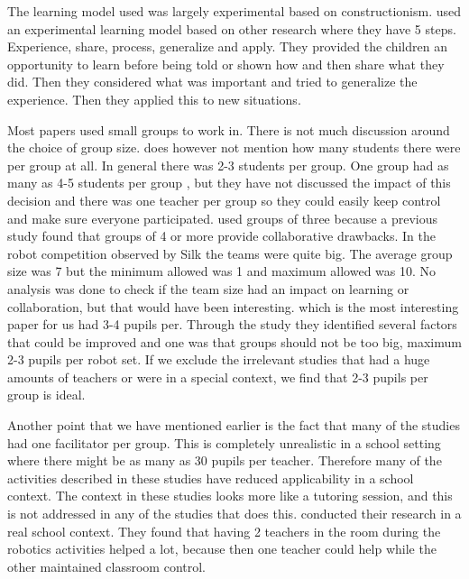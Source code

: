 \bigskip\noindent
The learning model used was largely experimental based on constructionism.  used an experimental learning model based on other research where they have 5 steps. Experience, share, process, generalize and apply. They provided the children an opportunity to learn before being told or shown how and then share what they did. Then they considered what was important and tried to generalize the experience. Then they applied this to new situations.

\bigskip\noindent
Most papers used small groups to work in. There is not much discussion around the choice of group size.  does however not mention how many students there were per group at all. In general there was 2-3 students per group\cite{mitnik2009collaborative, norton2004using, lindh2007does, silk2011resources, nugent2009use, williams2007acquisition}. One group had as many as 4-5 students per group \cite{barker2007robotics}, but they have not discussed the impact of this decision and there was one teacher per group so they could easily keep control and make sure everyone participated.  used groups of three because a previous study found that groups of 4 or more provide collaborative drawbacks. In the robot competition observed by Silk \cite{silk2011resources} the teams were quite big. The average group size was 7 but the minimum allowed was 1 and maximum allowed was 10. No analysis was done to check if the team size had an impact on learning or collaboration, but that would have been interesting.  which is the most interesting paper for us had 3-4 pupils per. Through the study they identified several factors that could be improved and one was that groups should not be too big, maximum 2-3 pupils per robot set. If we exclude the irrelevant studies that had a huge amounts of teachers or were in a special context, we find that 2-3 pupils per group is ideal.

\bigskip\noindent
Another point that we have mentioned earlier is the fact that many of the studies had one facilitator per group. This is completely unrealistic in a school setting where there might be as many as 30 pupils per teacher. Therefore many of the activities described in these studies have reduced applicability in a school context. The context in these studies looks more like a tutoring session, and this is not addressed in any of the studies that does this.  conducted their research in a real school context. They found that having 2 teachers in the room during the robotics activities helped a lot, because then one teacher could help while the other maintained classroom control.

